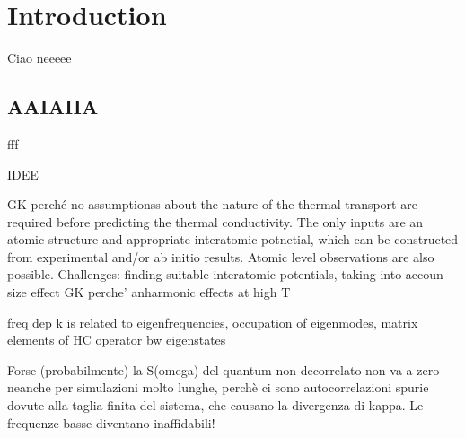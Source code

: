 \chapter{Introduction}

Ciao neeeee

\section{AAIAIIA}

fff


IDEE

GK perché no assumptionss about the nature of the thermal transport are required before predicting the thermal conductivity. The only inputs are an atomic structure and appropriate interatomic potnetial, which can be constructed from experimental and/or ab initio results. Atomic level observations are also possible. 
Challenges: finding suitable interatomic potentials, taking into accoun size effect
GK perche' anharmonic effects at high T

freq dep k is related to eigenfrequencies, occupation of eigenmodes, matrix elements of HC operator  bw eigenstates

Forse (probabilmente) la S(omega) del quantum non decorrelato non va a zero neanche per simulazioni molto lunghe, perchè ci sono autocorrelazioni spurie dovute alla taglia finita del sistema, che causano la divergenza di kappa.
Le frequenze basse diventano inaffidabili!
